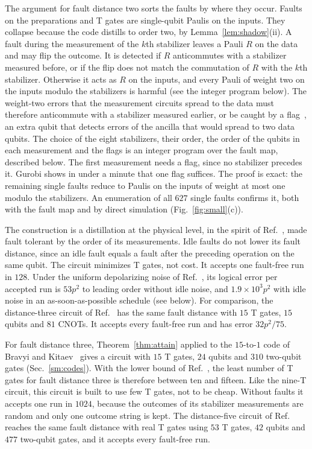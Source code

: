 \documentclass[aps,prl,reprint,twocolumn,amsmath,amssymb,floatfix,nofootinbib,superscriptaddress]{revtex4-2}
\theoremstyle{definition}
\theoremstyle{remark}
\begin{document}
The argument for fault distance two sorts the faults by where they occur. Faults on the preparations and T gates are single-qubit Paulis on the inputs. They collapse because the code distills to order two, by Lemma~\ref{lem:shadow}(ii). A fault during the measurement of the $k$th stabilizer leaves a Pauli $R$ on the data and may flip the outcome. It is detected if $R$ anticommutes with a stabilizer measured before, or if the flip does not match the commutation of $R$ with the $k$th stabilizer. Otherwise it acts as $R$ on the inputs, and every Pauli of weight two on the inputs modulo the stabilizers is harmful (see the integer program below). The weight-two errors that the measurement circuits spread to the data must therefore anticommute with a stabilizer measured earlier, or be caught by a flag~\cite{chaoreichardt}, an extra qubit that detects errors of the ancilla that would spread to two data qubits. The choice of the eight stabilizers, their order, the order of the qubits in each measurement and the flags is an integer program over the fault map, described below. The first measurement needs a flag, since no stabilizer precedes it. Gurobi shows in under a minute that one flag suffices. The proof is exact: the remaining single faults reduce to Paulis on the inputs of weight at most one modulo the stabilizers. An enumeration of all $627$ single faults confirms it, both with the fault map and by direct simulation (Fig.~\ref{fig:small}(c)).

The construction is a distillation at the physical level, in the spirit of Ref.~\cite{itogawa}, made fault tolerant by the order of its measurements. Idle faults do not lower its fault distance, since an idle fault equals a fault after the preceding operation on the same qubit. The circuit minimizes T gates, not cost. It accepts one fault-free run in $128$. Under the uniform depolarizing noise of Ref.~\cite{cultivation}, its logical error per accepted run is $53p^2$ to leading order without idle noise, and $1.9\times10^3p^2$ with idle noise in an as-soon-as-possible schedule (see below). For comparison, the distance-three circuit of Ref.~\cite{cultivation} has the same fault distance with $15$ T gates, $15$ qubits and $81$ CNOTs. It accepts every fault-free run and has error $32p^2/75$.

For fault distance three, Theorem~\ref{thm:attain} applied to the $15$-to-$1$ code of Bravyi and Kitaev~\cite{bravyikitaev} gives a circuit with $15$ T gates, $24$ qubits and $310$ two-qubit gates (Sec.~\ref{sm:codes}). With the lower bound of Ref.~\cite{distillationpaper}, the least number of T gates for fault distance three is therefore between ten and fifteen. Like the nine-T circuit, this circuit is built to use few T gates, not to be cheap. Without faults it accepts one run in $1024$, because the outcomes of its stabilizer measurements are random and only one outcome string is kept. The distance-five circuit of Ref.~\cite{cultivation} reaches the same fault distance with real T gates using $53$ T gates, $42$ qubits and $477$ two-qubit gates, and it accepts every fault-free run.
\end{document}
